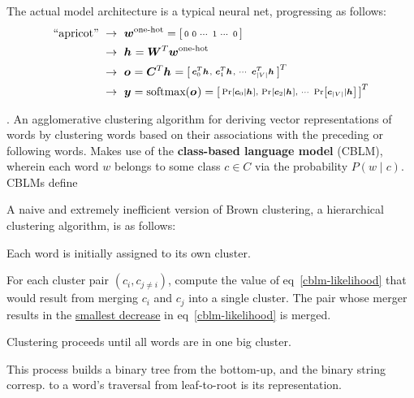 \documentclass[11pt]{article}
\renewcommand\vec[2][]{\bm{#2}_{#1}}
\newcommand\myspace[1][]{\vspace{#1\bigskipamount}}
\newcommand\p{\Needspace{10\baselineskip} \noindent}
\begin{document}
\p The actual model architecture is a typical neural net, progressing as follows:
\begin{align}
	\text{``apricot''} 
	~ &\rightarrow ~
	\vec{w}^{\text{one-hot}} =  \begin{bsmallmatrix} 0 & 0 & \cdots & 1 & \cdots & 0 \end{bsmallmatrix}\\
	~ &\rightarrow ~
	\vec{h} = \matr{W}^T \vec{w}^{\text{one-hot}} \\
	~ &\rightarrow ~ 
	\vec{o} = \matr{C}^T \vec{h} = \begin{bsmallmatrix} 
		\vec[0]{c}^T\vec{h}, & \vec[1]{c}^T\vec{h}, & \cdots & \vec[|V|]{c}^T\vec{h} \end{bsmallmatrix}^T \\
	~ &\rightarrow ~ 
	\vec{y} = \text{softmax}(\vec{o}) = \begin{bsmallmatrix} 
		\Prob{\vec[0]{c} \mid \vec{h}}, & \Prob{\vec[2]{c} \mid \vec{h}},  & \cdots & \Prob{\vec[|V|]{c} \mid \vec{h}} \end{bsmallmatrix}^T \\
\end{align}

\myspace
\p {}. An agglomerative clustering algorithm for deriving vector representations of words by clustering words based on their associations with the preceding or following words. Makes use of the \textbf{class-based language model} (CBLM), wherein each word $w$ belongs to some class $c \in C$ via the probability $P(w \mid c)$. CBLMs define

A naive and extremely inefficient version of Brown clustering, a hierarchical clustering algorithm, is as follows:
\begin{compactenum}
	\item Each word is initially assigned to its own cluster.
	
	\item For each cluster pair $(c_i, c_{j \ne i})$, compute the value of eq~\ref{cblm-likelihood} that would result from merging $c_i$ and $c_j$ into a single cluster. The pair whose merger results in the \underline{smallest decrease} in eq~\ref{cblm-likelihood} is merged.
	
	\item Clustering proceeds until all words are in one big cluster.
\end{compactenum}
This process builds a binary tree from the bottom-up, and the binary string corresp. to a word's traversal from leaf-to-root is its representation.
\end{document}
